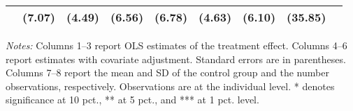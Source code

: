 \begin{table}[h]
{\begin{threeparttable}
\begin{tabular}{l*{8}{c}}
          &   (7.07)&   (4.49)&   (6.56)&   (6.78)&   (4.63)&   (6.10)&  (35.85)&         \\
\bottomrule \end{tabular} \begin{tablenotes}[flushleft] \footnotesize \item \emph{Notes:} Columns 1--3 report OLS estimates of the treatment effect. Columns 4--6 report estimates with covariate adjustment. Standard errors are in parentheses. Columns 7--8 report the mean and SD of the control group and the number observations, respectively. Observations are at the individual level. * denotes significance at 10 pct., ** at 5 pct., and *** at 1 pct. level. \end{tablenotes} \end{threeparttable} } \end{table}

